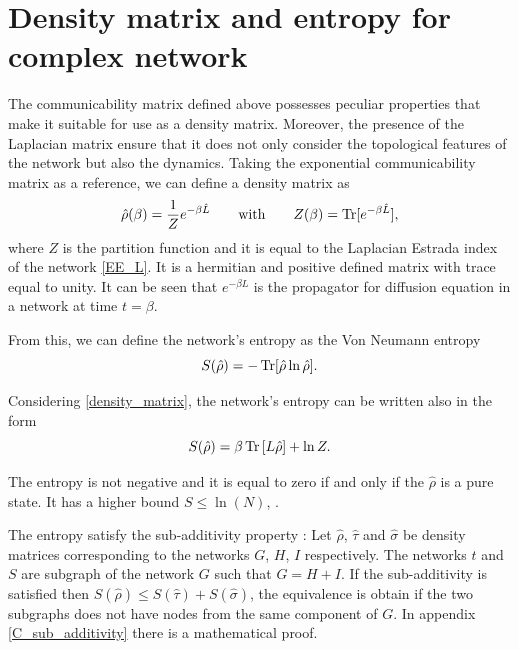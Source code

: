 \section{Density matrix and entropy for complex network}
The communicability matrix defined above possesses peculiar properties that make it suitable for use as a density matrix. Moreover, the presence of the Laplacian matrix ensure that it does not only consider the topological features of the network but also the dynamics. Taking the exponential communicability matrix as a reference, we can define a density matrix as
\begin{equation}\label{density_matrix}
    \hat \rho(\beta) = \frac{1}{Z} e^{-\beta \hat L} \qquad \mathrm{with} \qquad Z(\beta) = \operatorname{Tr}[e^{-\beta \hat L}],
\end{equation}
where $Z$ is the partition function and it is equal to the Laplacian Estrada index of the network \eqref{EE_L}.
It is a hermitian and positive defined matrix with trace equal to unity. 
It can be seen that $e^{-\beta L}$ is the propagator for diffusion equation in a network at time $t = \beta$.

From this, we can define the network's entropy as the Von Neumann entropy
\begin{equation} \label{entropy}
    S(\hat\rho) = -\operatorname{Tr}[\hat \rho \ln \hat \rho].
\end{equation}

Considering \eqref{density_matrix}, the network's entropy can be written also in the form
\begin{equation}\label{alternative_entropy}
    S(\hat\rho) = \beta \operatorname{Tr}\left[L\hat\rho\right] + \ln Z.
\end{equation}

The entropy is not negative and it is equal to zero if and only if the $\hat\rho$ is a pure state. It has a higher bound $S \leq \ln(N)$,  \cite{Nielsen_Chuang_2010}.

The entropy satisfy the sub-additivity property \cite{De_Domenico_2016}:
Let $\hat\rho$, $\hat\tau$ and $\hat\sigma$ be density matrices corresponding to the networks $G$, $H$, $I$ respectively. The networks $t$ and $S$ are subgraph of the network $G$ such that $G = H + I$.
If the sub-additivity is satisfied  then $S(\hat\rho) \leq S(\hat\tau) + S(\hat\sigma)$, the equivalence is obtain if the two subgraphs does not have nodes from the same component of $G$. In appendix \ref{C_sub_additivity} there is a mathematical proof.




